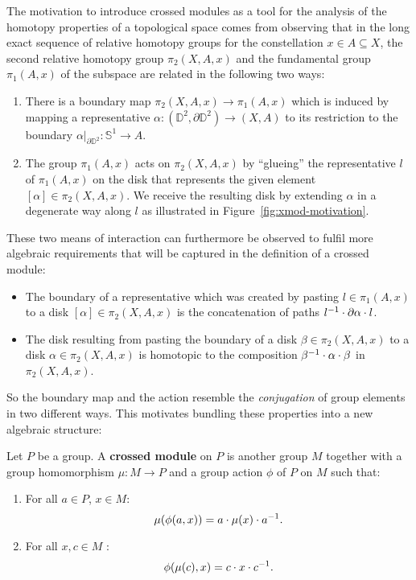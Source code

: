 The motivation to introduce crossed modules as a tool for the analysis of the
homotopy properties of a topological space comes from observing that in the
long exact sequence of relative homotopy groups for the constellation 
$x \in A \subseteq X$,
the second relative homotopy group $\pi_2(X, A, x)$ and the fundamental group
$\pi_1(A, x)$ of the subspace are related in the following two ways:
\begin{enumerate}
\item There is a boundary map $\pi_2(X, A, x) \to \pi_1(A, x)$ which is induced
by mapping a representative $\alpha : (\mathbb{D}^2, \partial \mathbb{D}^2) \to 
(X, A)$ to its restriction to the boundary $\left.\alpha\right|_{\partial \mathbb{D}^2}
: \mathbb{S}^1 \to A$.
\item The group $\pi_1(A, x)$ acts on $\pi_2(X, A, x)$ by ``glueing'' the
representative $l$ of $\pi_1(A, x)$ on the disk that represents the given
element $[\alpha] \in \pi_2(X, A, x)$.
We receive the resulting disk by extending $\alpha$ in a degenerate way along
$l$ as illustrated in Figure~\ref{fig:xmod-motivation}.
\end{enumerate}
These two means of interaction can furthermore be observed to fulfil more algebraic
requirements that will be captured in the definition of a crossed module:
\begin{itemize}
\item The boundary of a representative which was created by pasting $l \in \pi_1(A, x)$
to a disk $[\alpha] \in \pi_2(X, A, x)$ is the
concatenation of paths $l^{-1} \cdot \partial \alpha \cdot l$.
\item The disk resulting from pasting the boundary of a disk $\beta \in \pi_2(X, A, x)$
to a disk $\alpha \in \pi_2(X, A, x)$ is homotopic to the composition
$\beta^{-1} \cdot \alpha \cdot \beta$ in $\pi_2(X, A, x)$.
\end{itemize}
So the boundary map and the action resemble the \emph{conjugation} of group elements
in two different ways. This motivates bundling these properties into a new algebraic
structure:

\begin{defn}
Let $P$ be a group. A \textbf{crossed module} on $P$ is another group $M$ together
with a group homomorphism $\mu : M \to P$ and a group action $\phi$ of $P$ on
$M$ such that:
\begin{enumerate}
\item For all $a \in P$, $x \in M$:
\begin{equation} \label{eq:gp-CM1}
\mu(\phi(a,x)) = a \cdot \mu(x) \cdot a^{-1} \text{.}
\end{equation}
\item For all $x, c \in M$ :
\begin{equation} \label{eq:gp-CM2}
\phi(\mu(c),x) = c \cdot x \cdot c^{-1} \text{.}
\end{equation}
\end{enumerate}
\end{defn}

